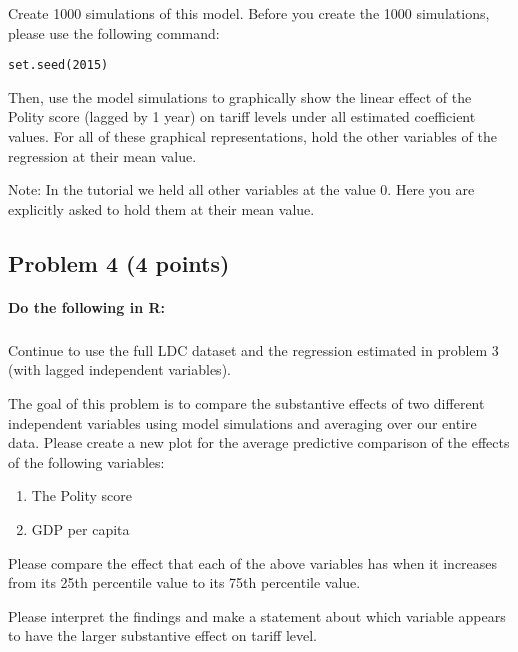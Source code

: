 \documentclass[12pt]{article}
\begin{document}
\bigskip

Create 1000 simulations of this model. Before you create the 1000 simulations, please use the following command:

\begin{verbatim}
set.seed(2015)
\end{verbatim}

Then, use the model simulations to graphically show the linear effect of the Polity score (lagged by 1 year) on tariff levels under all estimated coefficient values. For all of these graphical representations, hold the other variables of the regression at their mean value.

\bigskip

Note: In the tutorial we held all other variables at the value 0. Here you are explicitly asked to hold them at their mean value.


\pagebreak

\subsection*{Problem 4 (4 points)}

\paragraph{Do the following in R:}

\subparagraph{} Continue to use the full LDC dataset and the regression estimated in problem 3 (with lagged independent variables).

The goal of this problem is to compare the substantive effects of two different independent variables using model simulations and averaging over our entire data. Please create a new plot for the average predictive comparison of the effects of the following variables:

\begin{enumerate}
	\item The Polity score
	\item GDP per capita
\end{enumerate}

Please compare the effect that each of the above variables has when it increases from its 25th percentile value to its 75th percentile value.

Please interpret the findings and make a statement about which variable appears to have the larger substantive effect on tariff level.
\end{document}
